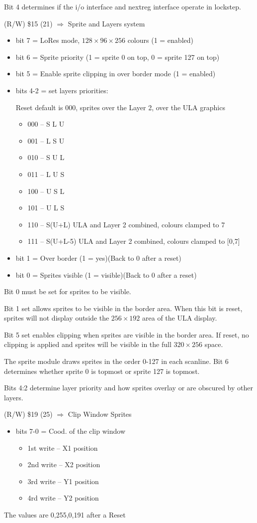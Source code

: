 Bit 4 determines if the i/o interface and nextreg interface operate in lockstep.

(R/W) \$15 (21) $\Rightarrow$ Sprite and Layers system
\begin{itemize}
\item[] bit 7 = LoRes mode, $128\times96\times256$ colours (1 =
  enabled)
\item[] bit 6 = Sprite priority (1 = sprite 0 on top, 0 = sprite 127
  on top)
\item[] bit 5 = Enable sprite clipping in over border mode (1 =
  enabled)
\item[] bits 4-2 = set layers priorities:

Reset default is 000, sprites over the Layer 2, over the ULA graphics
\begin{itemize}
\item[] 000 – S L U
\item[] 001 – L S U
\item[] 010 – S U L
\item[] 011 – L U S
\item[] 100 – U S L
\item[] 101 – U L S
\item[] 110 – S(U+L) ULA and Layer 2 combined, colours clamped to 7
\item[] 111 – S(U+L-5) ULA and Layer 2 combined, colours clamped to
  [0,7]
\end{itemize}
\item[] bit 1 = Over border (1 = yes)(Back to 0 after a reset)
\item[] bit 0 = Sprites visible (1 = visible)(Back to 0 after a reset)
\end{itemize}

Bit 0 must be set for sprites to be visible.

Bit 1 set allows sprites to be visible in the border area. When this
bit is reset, sprites will not display outside the $256\times192$ area
of the ULA display.

Bit 5 set enables clipping when sprites are visible in the border
area. If reset, no clipping is applied and sprites will be visible in
the full $320\times256$ space.

The sprite module draws sprites in the order 0-127 in each
scanline. Bit 6 determines whether sprite 0 is topmost or sprite 127
is topmost.

Bits 4:2 determine layer priority and how sprites overlay or are
obscured by other layers.

(R/W) \$19 (25) $\Rightarrow$ Clip Window Sprites
\begin{itemize}
\item[] bits 7-0 = Cood. of the clip window
  \begin{itemize}
  \item[] 1st write – X1 position
  \item[] 2nd write – X2 position
  \item[] 3rd write – Y1 position
  \item[] 4rd write – Y2 position
  \end{itemize}
\end{itemize}
The values are 0,255,0,191 after a Reset

